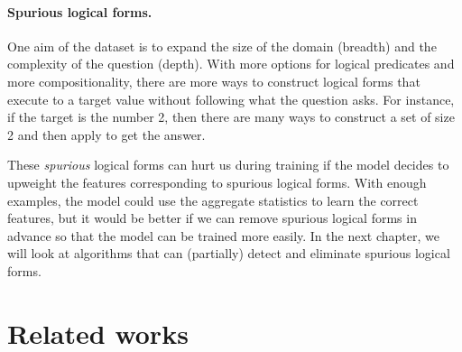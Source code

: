 \paragraph{Spurious logical forms.}
One aim of the \wtq dataset is to expand the size of the domain
(breadth) and the complexity of the question (depth).
With more options for logical predicates
and more compositionality,
there are more ways to construct logical forms
that execute to a target value
without following what the question asks.
For instance, if the target is the number 2,
then there are many ways to construct a set of size 2
and then apply  to get the answer.

These \emph{spurious} logical forms can hurt us
during training if the model decides to upweight the features
corresponding to spurious logical forms.
With enough examples, the model could
use the aggregate statistics to learn the correct features,
but it would be better if we can remove
spurious logical forms in advance so that
the model can be trained more easily.
In the next chapter,
we will look at algorithms that can (partially)
detect and eliminate spurious logical forms.

\section{Related works}

